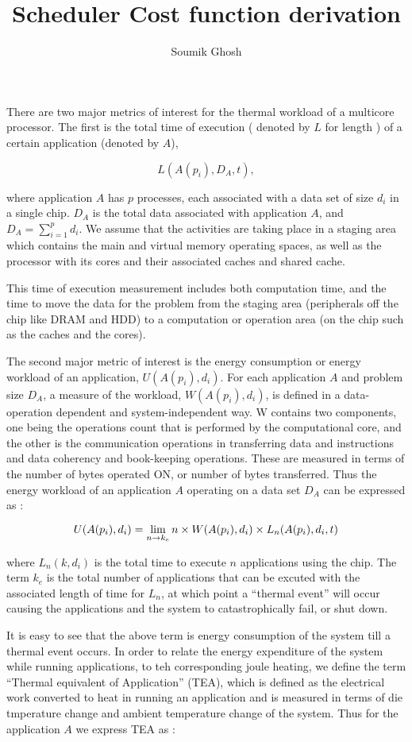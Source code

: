 \documentclass[11pt]{amsart}
\title{Scheduler Cost function derivation}
\author{Soumik Ghosh}
\date{}
\begin{document}
\maketitle


There are two major metrics of interest for the thermal workload of a multicore processor. The first is the total time of execution ( denoted by $L$ for length ) of a certain application (denoted by $A$), 

\[
L(A(p_i),D_A,t),
\]

where application $A$ has $p$ processes, each associated with a data set of size $d_i$ in a single chip. $D_A$ is the total data associated with application $A$, and $D_A = \sum_{i=1}^p{d_i}$. 
We assume that the activities are taking place in a staging area which contains the main and virtual memory operating spaces, as well as the processor with its cores and their associated caches and shared cache.

This time of execution measurement includes both computation time, and the time to move the data for the problem from the staging area (peripherals off the chip like DRAM and HDD) to a computation or operation area (on the chip such as the caches and the cores).

The second major metric of interest is the energy consumption or energy workload of an application, $U(A(p_i),d_i)$. For each application $A$ and problem size $D_A$, a measure of the workload, $W(A(p_i),d_i)$, is defined in a data-operation dependent and system-independent way. W contains two components, one being the operations count that is performed by the computational core, and the other is the communication operations in transferring data and instructions and data coherency and book-keeping operations. These are measured in terms of the number of bytes operated ON, or number of bytes transferred. Thus the energy workload of an application $A$ operating on a data set $D_A$ can be expressed as :

\[
U(A(p_i),d_i) = \displaystyle \lim_{n \to k_e }n \times W(A(p_i),d_i) \times L_n(A(p_i),d_i,t) \\
\]

where $L_n(k, d_i)$ is the total time to execute $n$ applications using the chip. The term $k_e$ is the total number of applications that can be excuted with the associated length of time for $L_n$, at which point a ``thermal event'' will occur causing the applications and the system to catastrophically fail, or shut down. 

It is easy to see that the above term is energy consumption of the system till a thermal event occurs. In order to relate the energy expenditure of the system while running applications, to teh corresponding joule heating, we define the term ``Thermal equivalent of Application'' (TEA), which is defined as the electrical work converted to heat in running an application and is measured in terms of die tmperature change and ambient temperature change of the system. Thus for the application $A$ we express TEA as :
\end{document}
